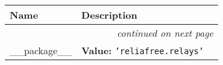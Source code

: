     \vspace{-1cm}
\hspace{\varindent}\begin{longtable}{|p{\varnamewidth}|p{\vardescrwidth}|l}
\cline{1-2}
\cline{1-2} \centering \textbf{Name} & \centering \textbf{Description}& \\
\cline{1-2}
\endhead\cline{1-2}\multicolumn{3}{r}{\small\textit{continued on next page}}\\\endfoot\cline{1-2}
\endlastfoot\raggedright \_\-\_\-p\-a\-c\-k\-a\-g\-e\-\_\-\_\- & \raggedright \textbf{Value:} 
{\tt \texttt{'}\texttt{reliafree.relays}\texttt{'}}&\\
\cline{1-2}
\end{longtable}


